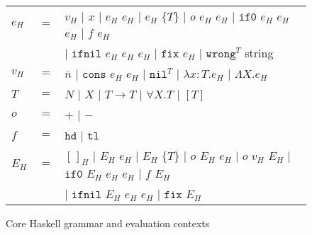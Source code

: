 \begin{figure}[b!]
\centering
\begin{tabular}{lcl}
$e_{H}$ & $=$ & $v_{H}$ $\vert$ $x$ $\vert$ $e_{H}$ $e_{H}$ $\vert$ $e_{H}$ $\lbrace T\rbrace$ $\vert$ $o$ $e_{H}$ $e_{H}$ $\vert$ $\mathtt{if0}$ $e_{H}$ $e_{H}$ $e_{H}$ $\vert$ $f$ $e_{H}$ \\

\vspace{5pt}

&& $\vert$ $\mathtt{ifnil}$ $e_{H}$ $e_{H}$ $e_{H}$ $\vert$ $\mathtt{fix}$ $e_{H}$ $\vert$ $\mathtt{wrong}^{T}$ string \\

\vspace{5pt}

$v_{H}$ & $=$ & $\overline{n}$ $\vert$ $\mathtt{cons}$ $e_{H}$ $e_{H}$ $\vert$ $\mathtt{nil}^{T}$ $\vert$ $\lambda x:T.e_{H}$ $\vert$ $\Lambda X.e_{H}$ \\

\vspace{5pt}

$T$ & $=$ & $N$ $\vert$ $X$ $\vert$ $T\rightarrow T$ $\vert$ $\forall X.T$ $\vert$ $[T]$ \\

\vspace{5pt}

$o$ & $=$ & $\mathtt{+}$ $\vert$ $\mathtt{-}$ \\

\vspace{5pt}

$f$ & $=$ & $\mathtt{hd}$ $\vert$ $\mathtt{tl}$ \\

\vspace{5pt}

$E_{H}$ & $=$ & $[\,]_{H}$ $\vert$ $E_{H}$ $e_{H}$ $\vert$ $E_{H}$ $\lbrace T\rbrace$ $\vert$ $o$ $E_{H}$ $e_{H}$ $\vert$ $o$ $v_{H}$ $E_{H}$ $\vert$ $\mathtt{if0}$ $E_{H}$ $e_{H}$ $e_{H}$ $\vert$ $f$ $E_{H}$ \\

\vspace{5pt}

&& $\vert$ $\mathtt{ifnil}$ $E_{H}$ $e_{H}$ $e_{H}$ $\vert$ $\mathtt{fix}$ $E_{H}$
\end{tabular}
\caption{Core Haskell grammar and evaluation contexts}
\label{hce}
\end{figure}
